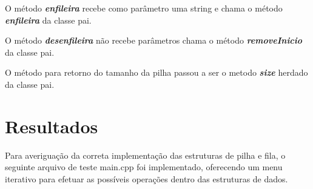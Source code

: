 \documentclass[rascunho,xindy,sublist]{fei}
\begin{document}
O método \textbf{\textit{enfileira}} recebe como parâmetro uma string e chama o método \textbf{\textit{enfileira}} da classe pai.

O método \textbf{\textit{desenfileira}} não recebe parâmetros chama o método \textbf{\textit{removeInicio}} da classe pai.

O método para retorno do tamanho da pilha passou a ser o metodo \textbf{\textit{size}} herdado da classe pai. 

\chapter{Resultados}

Para averiguação da correta implementação das estruturas de pilha e fila, o seguinte arquivo de teste main.cpp foi implementado, oferecendo um menu iterativo para efetuar as possíveis operações dentro das estruturas de dados.
\end{document}
